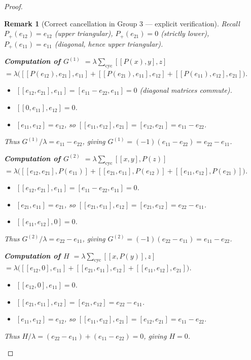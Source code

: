 \documentclass[10pt]{amsart}
\numberwithin{equation}{section}
\newtheorem{remark}[theorem]{Remark}
\begin{document}
\begin{proof}
\begin{remark}[Correct cancellation in Group 3 --- explicit verification]
Recall $P_+(e_{12}) = e_{12}$ (upper triangular), $P_+(e_{21}) = 0$ (strictly lower),
$P_+(e_{11}) = e_{11}$ (diagonal, hence upper triangular).

\medskip
\noindent\textbf{Computation of $G^{(1)}$} $= \lambda\sum_{\mathrm{cyc}}[[P(x),y],z]$
$= \lambda\bigl([[P(e_{12}),e_{21}],e_{11}] + [[P(e_{21}),e_{11}],e_{12}]
+ [[P(e_{11}),e_{12}],e_{21}]\bigr)$.

\begin{itemize}
  \item $[[e_{12},e_{21}],e_{11}] = [e_{11}-e_{22},e_{11}] = 0$ (diagonal matrices commute).
  \item $[[0,e_{11}],e_{12}] = 0$.
  \item $[e_{11},e_{12}] = e_{12}$, so $[[e_{11},e_{12}],e_{21}] = [e_{12},e_{21}]
        = e_{11}-e_{22}$.
\end{itemize}
Thus $G^{(1)}/\lambda = e_{11}-e_{22}$, giving $G^{(1)} = (-1)(e_{11}-e_{22}) = e_{22}-e_{11}$.

\medskip
\noindent\textbf{Computation of $G^{(2)}$} $= \lambda\sum_{\mathrm{cyc}}[[x,y],P(z)]$
$= \lambda\bigl([[e_{12},e_{21}],P(e_{11})] + [[e_{21},e_{11}],P(e_{12})]
+ [[e_{11},e_{12}],P(e_{21})]\bigr)$.

\begin{itemize}
  \item $[[e_{12},e_{21}],e_{11}] = [e_{11}-e_{22},e_{11}] = 0$.
  \item $[e_{21},e_{11}] = e_{21}$, so $[[e_{21},e_{11}],e_{12}] = [e_{21},e_{12}]
        = e_{22}-e_{11}$.
  \item $[[e_{11},e_{12}],0] = 0$.
\end{itemize}
Thus $G^{(2)}/\lambda = e_{22}-e_{11}$, giving $G^{(2)} = (-1)(e_{22}-e_{11}) = e_{11}-e_{22}$.

\medskip
\noindent\textbf{Computation of $H$} $= \lambda\sum_{\mathrm{cyc}}[[x,P(y)],z]$
$= \lambda\bigl([[e_{12},0],e_{11}] + [[e_{21},e_{11}],e_{12}]
+ [[e_{11},e_{12}],e_{21}]\bigr)$.

\begin{itemize}
  \item $[[e_{12},0],e_{11}] = 0$.
  \item $[[e_{21},e_{11}],e_{12}] = [e_{21},e_{12}] = e_{22}-e_{11}$.
  \item $[e_{11},e_{12}] = e_{12}$, so $[[e_{11},e_{12}],e_{21}] = [e_{12},e_{21}]
        = e_{11}-e_{22}$.
\end{itemize}
Thus $H/\lambda = (e_{22}-e_{11})+(e_{11}-e_{22}) = 0$, giving $H = 0$.


\end{remark}
\end{proof}
\end{document}
